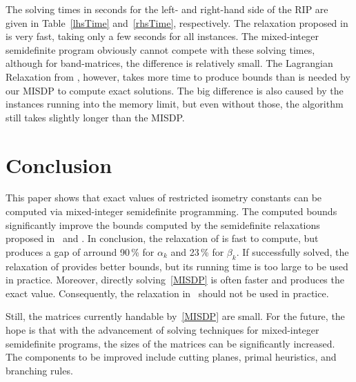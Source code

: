 \documentclass[journal]{IEEEtran}
\newcommand{\comment}[1]{\marginpar{\raggedright\tiny {#1}}}
\begin{document}


\comment{Wieder arith. Mean?}
The solving times in seconds for the left- and right-hand side of the RIP are given in
Table~\ref{lhsTime} and~\ref{rhsTime}, respectively. The relaxation proposed in \cite{Asp07}
is very fast, taking only a few seconds for all instances. The mixed-integer semidefinite program obviously
cannot compete with these solving times, although for band-matrices, the difference is relatively
small. The Lagrangian Relaxation from \cite{Asp08}, however, takes more time to produce bounds than is needed
by our MISDP to compute exact solutions. The big difference is also caused by the instances running into the 
memory limit, but even without those, the algorithm still takes slightly longer than the MISDP.





\section{Conclusion}

\noindent
This paper shows that exact values of restricted isometry constants can be
computed via mixed-integer semidefinite programming. The computed bounds
significantly improve the bounds computed by the semidefinite relaxations
proposed in~\cite{Asp07} and \cite{Asp08}. In conclusion, the relaxation of
\cite{Asp07} is fast to compute, but produces a gap of arround 90\,\% for
$\alpha_k$ and 23\,\% for $\beta_k$. If successfully solved, the relaxation
of \cite{Asp08} provides better bounds, but its running time is too large
to be used in practice. Moreover, directly solving~\eqref{MISDP} is often
faster and produces the exact value. Consequently, the relaxation
in~\cite{Asp08} should not be used in practice.

Still, the matrices currently handable by~\eqref{MISDP} are small. For the
future, the hope is that with the advancement of solving techniques for
mixed-integer semidefinite programs, the sizes of the matrices can be
significantly increased. The components to be improved include cutting
planes, primal heuristics, and branching rules.



\end{document}

